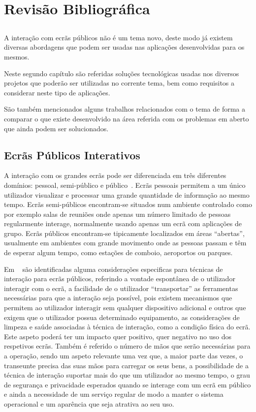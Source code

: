 \chapter{Revisão Bibliográfica} \label{chap:biblio}

\section*{}

A interação com ecrãs públicos não é um tema novo, deste modo já existem diversas abordagens que podem ser usadas nas aplicações desenvolvidas para os mesmos.
	
Neste segundo capítulo são referidas soluções tecnológicas usadas nos diversos projetos que poderão ser utilizadas no corrente tema, bem como requisitos a considerar neste tipo de aplicações.

São também mencionados alguns trabalhos relacionados com o tema de forma a comparar o que existe desenvolvido na área referida com os problemas em aberto que ainda podem ser solucionados. 

\section{Ecrãs Públicos Interativos}

A interação com os grandes ecrãs pode ser diferenciada em três diferentes domínios: pessoal, semi-público e público~\cite{Ballagas}. Ecrãs pessoais permitem a um único utilizador visualizar e processar uma grande quantidade de informação ao mesmo tempo. Ecrãs semi-públicos encontram-se situados  num ambiente controlado como  por exemplo salas de reuniões onde apenas um número limitado de pessoas regularmente interage, normalmente usando apenas um ecrã com aplicações de grupo. Ecrãs públicos encontram-se tipicamente localizados em áreas “abertas”, usualmente em ambientes com grande movimento onde as pessoas passam e têm de esperar algum tempo, como estações de comboio, aeroportos ou parques.

Em ~\cite{Ballagas} são identificadas alguma considerações especificas para técnicas de interação para ecrãs públicos, referindo a vontade espontânea de o utilizador interagir com o ecrã, a facilidade de o utilizador “transportar” as ferramentas necessárias para que a interação seja possível, pois existem mecanismos que permitem ao utilizador interagir sem qualquer dispositivo adicional e outros que exigem que o utilizador possua determinado equipamento, as considerações de limpeza e saúde associadas à técnica de interação, como a condição física do ecrã. Este aspeto poderá ter um impacto quer positivo, quer negativo no uso dos respetivos ecrãs. Também é referido o número de mãos que serão necessárias para a operação, sendo um aspeto relevante uma vez que, a maior parte das vezes, o transeunte precisa das suas mãos para carregar os seus bens, a possibilidade de a técnica de interação suportar mais do que um utilizador ao mesmo tempo, o grau de segurança e privacidade esperados quando se interage com um ecrã em público e ainda a necessidade de um serviço regular de modo a manter o sistema operacional e um aparência que seja atrativa ao seu uso.

